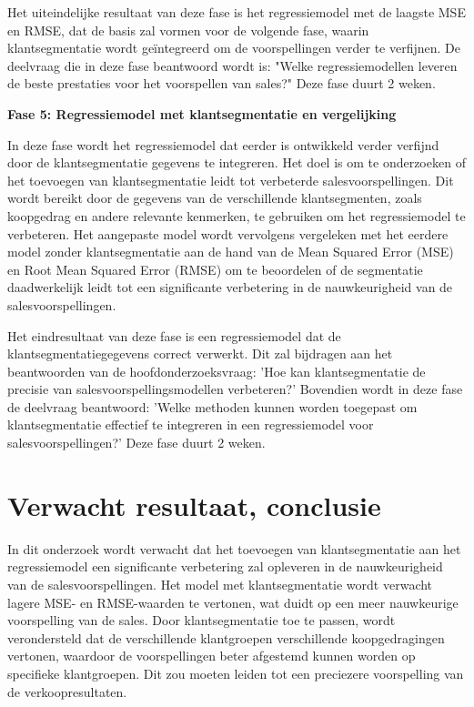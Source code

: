 Het uiteindelijke resultaat van deze fase is het regressiemodel met de laagste MSE en RMSE, dat de basis zal vormen voor de volgende fase, waarin klantsegmentatie wordt geïntegreerd om de voorspellingen verder te verfijnen. De deelvraag die in deze fase beantwoord wordt is: "Welke regressiemodellen leveren de beste prestaties voor het voorspellen van sales?" Deze fase duurt 2 weken.

\textbf{Fase 5: Regressiemodel met klantsegmentatie en vergelijking}

In deze fase wordt het regressiemodel dat eerder is ontwikkeld verder verfijnd door de klantsegmentatie gegevens te integreren. Het doel is om te onderzoeken of het toevoegen van klantsegmentatie leidt tot verbeterde salesvoorspellingen. Dit wordt bereikt door de gegevens van de verschillende klantsegmenten, zoals koopgedrag en andere relevante kenmerken, te gebruiken om het regressiemodel te verbeteren. Het aangepaste model wordt vervolgens vergeleken met het eerdere model zonder klantsegmentatie aan de hand van de Mean Squared Error (MSE) en Root Mean Squared Error (RMSE) om te beoordelen of de segmentatie daadwerkelijk leidt tot een significante verbetering in de nauwkeurigheid van de salesvoorspellingen.

Het eindresultaat van deze fase is een regressiemodel dat de klantsegmentatiegegevens correct verwerkt. Dit zal bijdragen aan het beantwoorden van de hoofdonderzoeksvraag: 'Hoe kan klantsegmentatie de precisie van salesvoorspellingsmodellen verbeteren?' Bovendien wordt in deze fase de deelvraag beantwoord: 'Welke methoden kunnen worden toegepast om klantsegmentatie effectief te integreren in een regressiemodel voor salesvoorspellingen?' Deze fase duurt 2 weken.


\section{Verwacht resultaat, conclusie}%
\label{sec:verwachte_resultaten}

In dit onderzoek wordt verwacht dat het toevoegen van klantsegmentatie aan het regressiemodel een significante verbetering zal opleveren in de nauwkeurigheid van de salesvoorspellingen. Het model met klantsegmentatie wordt verwacht lagere MSE- en RMSE-waarden te vertonen, wat duidt op een meer nauwkeurige voorspelling van de sales. Door klantsegmentatie toe te passen, wordt verondersteld dat de verschillende klantgroepen verschillende koopgedragingen vertonen, waardoor de voorspellingen beter afgestemd kunnen worden op specifieke klantgroepen. Dit zou moeten leiden tot een preciezere voorspelling van de verkoopresultaten.

